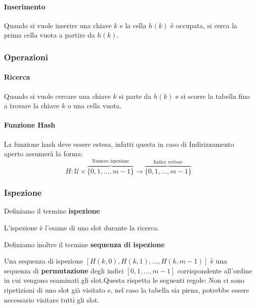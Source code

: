             \paragraph{Inserimento} Quando si vuole inserire una chiave $k$ e la cella $h(k)$ è occupata, si cerca la prima cella vuota a partire da $h(k)$.
        \subsubsection{Operazioni}
            \paragraph{Ricerca} Quando si vuole cercare una chiave $k$ si parte da $h(k)$ e si scorre la tabella fino a trovare la chiave $k$ o una cella vuota.
            \paragraph{Funzione Hash} La funzione hash deve essere estesa, infatti questa in caso di Indirizzamento aperto assumerà la forma:
            $$
                H: \mathcal{U} \times \overbrace{\{0, 1, \dots, m-1\}}^{\text{Numero ispezione}} \rightarrow \overbrace{\{0, 1, \dots, m-1\}}^{\text{Indice vettore}}
            $$
        \subsubsection{Ispezione} Definiamo il termine \textbf{ispezione}
            \begin{definition}[Ispezione]
                L'ispezione è l'esame di uno slot durante la ricerca.
            \end{definition}
            Definiamo inoltre il termine \textbf{sequenza di ispezione}
            \begin{definition}
                Una sequenza di ispezione $[H(k,0), H(k,1), \dots, H(k,m-1)]$ è una sequenza di \textbf{permutazione} degli indici $[0, 1, \dots, m-1]$ corrispondente all'ordine in cui vengono esaminati gli slot.\newline Questa rispetta le seguenti regole: Non ci sono ripetizioni di uno slot già visitato e, nel caso la tabella sia piena, potrebbe essere necessario visitare tutti gli slot.
            \end{definition}

